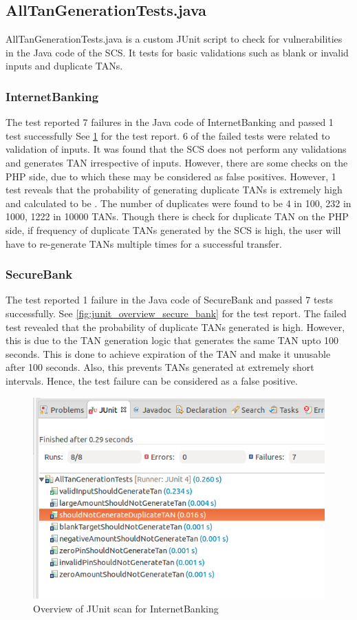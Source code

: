 \subsection{AllTanGenerationTests.java}
AllTanGenerationTests.java is a custom JUnit script to check for vulnerabilities in the Java code of the SCS. It tests for basic validations such as blank or invalid inputs and duplicate TANs.

\subsubsection{InternetBanking}
The test reported 7 failures in the Java code of InternetBanking and passed 1 test successfully See \ref{fig:junit_overview} for the test report.
6 of the failed tests were related to validation of inputs. It was found that the SCS does not perform any validations and generates TAN irrespective of inputs. However, there are some checks on the PHP side, due to which these may be considered as false positives.
However, 1 test  reveals that the probability of generating duplicate TANs is extremely high and calculated to be . The number of duplicates were found to be 4 in 100, 232 in 1000, 1222 in 10000 TANs.
Though there is check for duplicate TAN on the PHP side, if frequency of duplicate TANs generated by the SCS is high, the user will have to re-generate TANs multiple times for a successful transfer.

\subsubsection{SecureBank}
The test reported 1 failure in the Java code of SecureBank and passed 7 tests successfully. See \ref{fig:junit_overview_secure_bank} for the test report.
The failed test  revealed that the probability of duplicate TANs generated is high. However, this is due to the TAN generation logic that generates the same TAN upto 100 seconds. This is done to achieve expiration of the TAN and make it unusable after 100 seconds. Also, this prevents TANs generated at extremely short intervals. Hence, the test failure can be considered as a false positive.

\begin{figure}[ht]
	\centering
	\includegraphics[width=.8\linewidth]{figures/junit_overview.png}
	\caption{Overview of JUnit scan for InternetBanking}
	\label{fig:junit_overview}
\end{figure}

